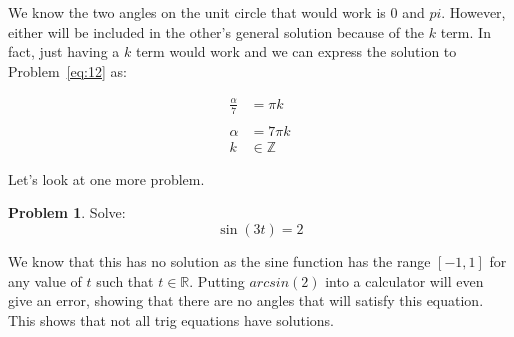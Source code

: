 \documentclass[12pt]{article}
\theoremstyle{definition}
\newtheorem{problem}{Problem}
\begin{document}
We know the two angles on the unit circle that would work is $0$ and $pi$.
However, either will be included in the other's general solution because of the $k$ term.
In fact, just having a $k$ term would work and we can express the solution to Problem~\eqref{eq:12} as:

\begin{align}
    \frac{\alpha}{7} & = \pi k        \\
    \nonumber                         \\
    \alpha           & = 7\pi k       \\
    k                & \in \mathbb{Z}
\end{align}

Let's look at one more problem.

\begin{problem}
Solve:
\begin{equation*}
    \sin(3t) = 2 \label{eq:13}
\end{equation*}
\end{problem}

We know that this has no solution as the sine function has the range $[-1, 1]$ for any value of $t$ such that $t \in \mathbb{R}$.
Putting $arcsin(2)$ into a calculator will even give an error, showing that there are no angles that will satisfy this equation.
This shows that not all trig equations have solutions.
\end{document}
